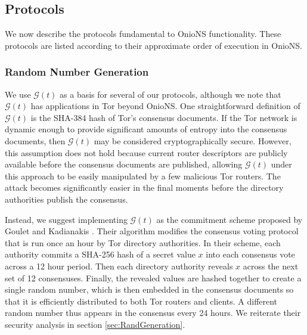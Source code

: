 \documentclass[USenglish,oneside,twocolumn]{article}
\begin{document}



\subsection{Protocols}
\label{sec:protocols}

We now describe the protocols fundamental to OnioNS functionality. These protocols are listed according to their approximate order of execution in OnioNS.

\subsubsection{Random Number Generation} %
\label{sec:rngProcess}

We use $ \mathcal{G}(t) $ as a basis for several of our protocols, although we note that $ \mathcal{G}(t) $ has applications in Tor beyond OnioNS. One straightforward definition of $ \mathcal{G}(t) $ is the SHA-384 hash of Tor's consensus documents. If the Tor network is dynamic enough to provide significant amounts of entropy into the consensus documents, then $ \mathcal{G}(t) $ may be considered cryptographically secure. However, this assumption does not hold because current router descriptors are publicly available before the consensus documents are published, allowing $ \mathcal{G}(t) $ under this approach to be easily manipulated by a few malicious Tor routers. The attack becomes significantly easier in the final moments before the directory authorities publish the consensus.

Instead, we suggest implementing $ \mathcal{G}(t) $ as the commitment scheme proposed by Goulet and Kadianakis \cite{GouletCommitReveal}. Their algorithm modifies the consensus voting protocol that is run once an hour by Tor directory authorities. In their scheme, each authority commits a SHA-256 hash of a secret value $ x $ into each consensus vote across a 12 hour period. Then each directory authority reveals $ x $ across the next set of 12 consensuses. Finally, the revealed values are hashed together to create a single random number, which is then embedded in the consensus documents so that it is efficiently distributed to both Tor routers and clients. A different random number thus appears in the consensus every 24 hours. We reiterate their security analysis in section \ref{sec:RandGeneration}.
\end{document}
